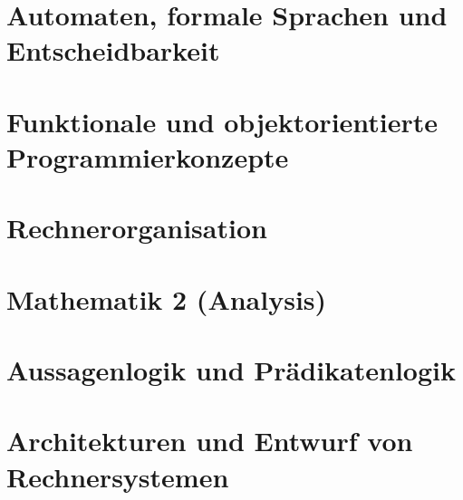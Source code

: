 \documentclass[english, notodo]{fdsummary}
\subtitle{Bachelor of Science (Part 1)}
\newcommand{\lstbasepath}{unset}
\begin{document}
	\maketitle
	\tableofcontents

	\cleardoublepage
	\part{Automaten, formale Sprachen und Entscheidbarkeit}
	\graphicspath{{./cs/mandatory/fs1/afe/}}
	\renewcommand{\lstbasepath}{./cs/mandatory/fs1/afe}
	
	
	\cleardoublepage
	\part{Funktionale und objektorientierte Programmierkonzepte}
	\graphicspath{{./cs/mandatory/fs1/fop/}}
	\renewcommand{\lstbasepath}{./cs/mandatory/fs1/fop}
	

	\cleardoublepage
	\part{Rechnerorganisation}
	\graphicspath{{./cs/mandatory/fs2/ro/}}
	\renewcommand{\lstbasepath}{./cs/mandatory/fs2/ro}
	
	
	\cleardoublepage
	\part{Mathematik 2 (Analysis)}
	\graphicspath{{./cs/mandatory/fs2/mathe2/}}
	\renewcommand{\lstbasepath}{./cs/mandatory/fs2/mathe2}
	
	
	\cleardoublepage
	\part{Aussagenlogik und Prädikatenlogik}
	\graphicspath{{./cs/mandatory/fs2/apl/}}
	\renewcommand{\lstbasepath}{./cs/mandatory/fs2/apl}
	
	
	\cleardoublepage
	\part{Architekturen und Entwurf von Rechnersystemen}
	\graphicspath{{./cs/mandatory/fs3/aer/}}
	\renewcommand{\lstbasepath}{./cs/mandatory/fs3/aer}
	
	
\end{document}
